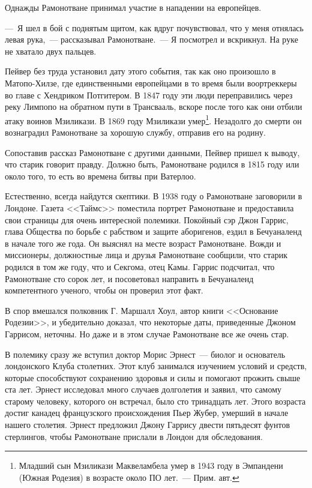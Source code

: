 \documentclass[12pt,a4paper,twoside,openany,svgnames]{memoir}
\begin{document}
Однажды Рамонотване принимал участие в нападении на европейцев.

---~Я шел в бой с поднятым щитом, как вдруг почувствовал, что у меня отнялась левая рука,~--- рассказывал Рамонотване.~--- Я посмотрел и вскрикнул. На руке не хватало двух пальцев.

Пейвер без труда установил дату этого события, так как оно произошло в Матопо-Хилзе, где единственными европейцами в то время были воортреккеры во главе с Хендриком Потгитером. В 1847 году эти люди переправились через реку Лимпопо на обратном пути в Трансвааль, вскоре после того как они отбили атаку воинов Мзиликази. В 1869 году Мзиликази умер\footnote{Младший сын Мзиликази Маквеламбела умер в 1943 году в Эмпандени (Южная Родезия) в возрасте около ПО лет.~--- Прим. авт.}. Незадолго до смерти он вознаградил Рамонотване за хорошую службу, отправив его на родину.

Сопоставив рассказ Рамонотване с другими данными, Пейвер пришел к выводу, что старик говорит правду. Должно быть, Рамонотване родился в 1815 году или около того, то есть во времена битвы при Ватерлоо.

Естественно, всегда найдутся скептики. В 1938 году о Рамонотване заговорили в Лондоне. Газета <<Таймс>> поместила портрет Рамонотване и предоставила свои страницы для очень интересной полемики. Покойный сэр Джон Гаррис, глава Общества по борьбе с рабством и защите аборигенов, ездил в Бечуаналенд в начале того же года. Он выяснял на месте возраст Рамонотване. Вожди и миссионеры, должностные лица и друзья Рамонотване сообщили, что старик родился в том же году, что и Секгома, отец Камы. Гаррис подсчитал, что Рамонотване сто сорок лет, и посоветовал направить в Бечуаналенд компетентного ученого, чтобы он проверил этот факт.

В спор вмешался полковник Г. Маршалл Хоул, автор книги <<Основание Родезии>>, и убедительно доказал, что некоторые даты, приведенные Джоном Гаррисом, неточны. Но даже и в этом случае Рамонотване все же очень стар.

В полемику сразу же вступил доктор Морис Эрнест~--- биолог и основатель лондонского Клуба столетних. Этот клуб занимался изучением условий и средств, которые способствуют сохранению здоровья и силы и помогают прожить свыше ста лет. Эрнест исследовал много случаев долголетия и заявил, что самому старому человеку, которого он встречал, было сто тринадцать лет. Этого возраста достиг канадец французского происхождения Пьер Жубер, умерший в начале нашего столетия. Эрнест предложил Джону Гаррису двести пятьдесят фунтов стерлингов, чтобы Рамонотване прислали в Лондон для обследования.
\end{document}
